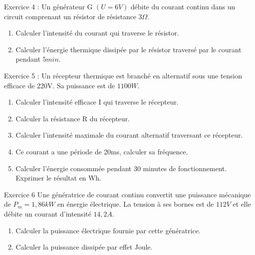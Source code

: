 \documentclass[12pt, french]{article}
\begin{document}
\begin{Box2}{Exercice 4 : }
Un générateur G $(U = 6 V)$ débite du courant continu dans un circuit comprenant un résistor de résistance $3\Omega$.
   \begin{enumerate}
\item    Calculer l’intensité du courant qui traverse le résistor.
\item  Calculer l’énergie thermique dissipée par le résistor traversé par le courant pendant $5 min$.
   \end{enumerate}

\end{Box2}

\begin{Box2}{Exercice 5 : }
Un récepteur thermique est branché en alternatif sous une tension efficace de 220V. Sa puissance est de $1100W$.
   \begin{enumerate}

   \item Calculer l’intensité efficace I qui traverse le récepteur.
   \item  Calculer la résistance R du récepteur.
   \item  Calculer l’intensité maximale du courant alternatif traversant ce récepteur.
   \item  Ce courant a une période de 20ms, calculer sa fréquence.

      \item Calculer l’énergie consommée pendant 30 minutes de fonctionnement. Exprimer le résultat en Wh.
         \end{enumerate}
\end{Box2}

\begin{Box2}{Exercice 6}
Une génératrice de courant continu convertit une puissance mécanique de $P_m= 1,86 kW$ en énergie électrique.
La tension à ses bornes est de $112V$ et elle débite un courant d’intensité $14,2 A$.
   \begin{enumerate}
   \item Calculer la puissance électrique fournie par cette génératrice.
   \item Calculer la puissance dissipée par effet Joule.
   \end{enumerate}
\end{Box2}
\end{document}
